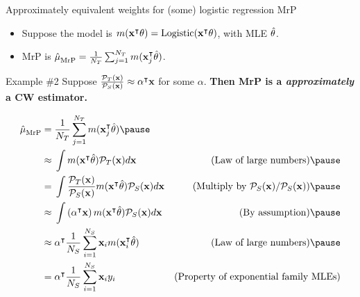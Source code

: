 \begin{frame}[t]{Approximately equivalent weights for (some) logistic regression MrP}

\def\alphav{\mathbf{\alpha}}
%
\begin{itemize}
    \item Suppose the model is $m(\mathbf{x}^\intercal \theta) = \mathrm{Logistic}(\mathbf{x}^\intercal \theta)$, with MLE $\hat{\theta}$.
    \item MrP is $\hat{\mu}^{}_{\mathrm{MrP}} = \frac{1}{{N_T}} \sum_{j=1}^{N_T} m(\mathbf{x}_j^\intercal \hat{\theta})$.
\end{itemize}
%
\begin{block}{Example \#2}
Suppose
    $\frac{\ptar(\x)}{\psur(\x)} \approx \alphav^\trans \x$ for some $\alpha$.
    \textbf{Then MrP is a \emph{approximately} a CW estimator.}
\end{block}\pause

$$
\begin{aligned}
\muhat_\mrp ={}& \meantar \m(\x_j^\trans \thetahat) \pause
\\ \approx{}&
    \int \m(\x^\trans \thetahat) \ptar(\x) d\x
    & \textrm{(Law of large numbers)} \pause
\\ ={}&
    \int \frac{\ptar(\x)}{\psur(\x)} \m(\x^\trans \thetahat) \psur(\x) d\x
    & \textrm{(Multiply by $\psur(\x) / \psur(\x)$)} \pause
\\ \approx{}&
    \int \left( \alphav^\trans \x\right) \m(\x^\trans \thetahat) \psur(\x) d\x
    & \textrm{(By assumption)} \pause
\\ \approx{}&
    \alphav^\trans \meansur \x_i \m(\x_i^\trans \thetahat)
    & \textrm{(Law of large numbers)}\pause
\\={}&
    \alphav^\trans \meansur \x_i \y_i
    & \textrm{(Property of exponential family MLEs)}
\end{aligned}
$$


\end{frame}



